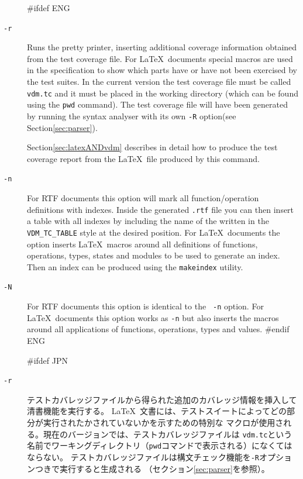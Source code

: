 \documentclass[\pformat,12pt]{article}
\begin{document}
\begin{description}

#ifdef ENG
\item[{\tt -r}] Runs the pretty printer, inserting additional coverage
  information obtained from the test coverage file. For \LaTeX\ 
  documents special macros are used in the specification to show which
  parts have or have not been exercised by the test suites.  In the
  current version the test coverage file\index{Test Coverage!File}
  must be called {\tt vdm.tc} 
  and it must be placed in the working directory (which can be found
  using the \texttt{pwd} command). The test
  coverage file will have been generated by running the syntax
  analyser with its own {\tt -R} option(see Section\ref{sec:parser}).
  
  Section\ref{sec:latexANDvdm} describes in detail how to produce the
  test coverage report from the \LaTeX\ file produced by this command.

\item[{\tt -n}] For RTF documents this option will mark all
  function/operation definitions with indexes. Inside the generated
  {\tt .rtf} file you can then insert a table with all indexes by
  including the name of the
   written in the
  \texttt{VDM\_TC\_TABLE} style at the desired position.
  For \LaTeX\ documents the option inserts \LaTeX\ 
  macros around all definitions of functions, operations, types,
  states and modules to be used to generate an index.  Then an
  index can be produced using the {\tt makeindex} utility.

\item[{\tt -N}] For RTF documents this option is identical to the {\tt
    -n} option. For \LaTeX\ documents this option works as {\tt -n}
  but also inserts the macros around all applications of functions,
  operations, types and values. 
#endif ENG

#ifdef JPN
\item[{\tt -r}]
  テストカバレッジファイルから得られた追加のカバレッジ情報を挿入して清書機能を実行する。
  \LaTeX\ 文書には、テストスイートによってどの部分が実行されたかされていないかを示すための特別な
  マクロが使用される。現在のバージョンでは、テストカバレッジファイルは
  {\tt vdm.tc}という名前でワーキングディレクトリ（\texttt{pwd}コマンドで表示される）になくてはならない。
  テストカバレッジファイルは構文チェック機能を{\tt -R}オプションつきで実行すると生成される
  （セクション\ref{sec:parser}を参照）。
  

\end{description}
\end{document}
